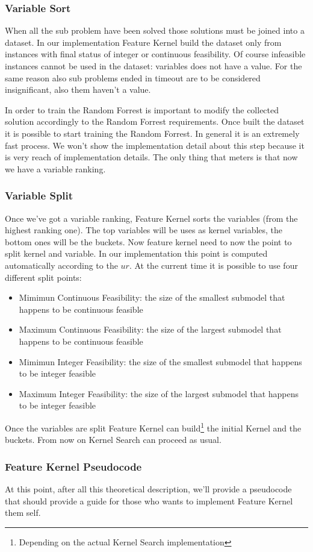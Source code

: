 \subsubsection{Variable Sort}
When all the sub problem have been solved those solutions must be joined into a dataset. In our implementation Feature Kernel build the dataset only from instances 
with final status of integer or continuous feasibility. Of course infeasible instances cannot be used in the dataset: variables does not have a value. For the same reason
also sub problems ended in timeout are to be considered insignificant, also them haven't a value.

In order to train the Random Forrest is important to modify the collected solution accordingly to the Random Forrest requirements. Once built the dataset it is possible to 
start training the Random Forrest. In general it is an extremely fast process. We won't show the implementation detail about this 
step because it is very reach of implementation details. 
The only thing that meters is that now we have a variable ranking.



\subsubsection{Variable Split}
Once we've got a variable ranking, Feature Kernel sorts the variables (from the highest ranking one). The top variables will be uses as kernel variables, the bottom ones will be
the buckets. Now feature kernel need to now the point to split kernel and variable. In our implementation this point is computed automatically according to the $ur$. 
At the current time it is possible to use four different split points:
\begin{itemize}
    \item Mimimun Continuous Feasibility: the size of the smallest submodel that happens to be continuous feasible
    \item  Maximum Continuous Feasibility: the size of the largest submodel that happens to be continuous feasible
    \item Mimimun Integer Feasibility: the size of the smallest submodel that happens to be integer feasible
    \item Maximum Integer Feasibility: the size of the largest submodel that happens to be integer feasible
\end{itemize}


Once the variables are split Feature Kernel can build\footnote{Depending on the actual Kernel Search implementation} the initial Kernel and the buckets. From now on Kernel Search can 
proceed as usual. 


\subsubsection{Feature Kernel Pseudocode}
At this point, after all this theoretical description, we'll provide a pseudocode that should provide a guide for those who wants to implement Feature Kernel them self.





